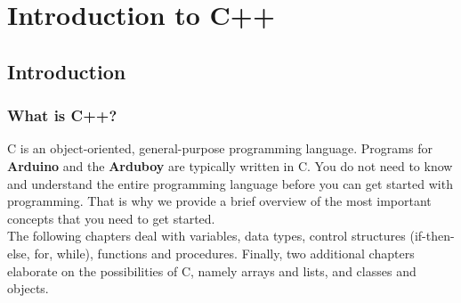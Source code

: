\documentclass[11pt,fleqn]{book} %
\def\Cpp{{C\nolinebreak[4]\hspace{-.05em}\raisebox{.4ex}{\tiny\bf ++}}}
\begin{document}



\pagestyle{empty} %

\tableofcontents %

\cleardoublepage %

\pagestyle{fancy} %


\part{Introduction to C++}
\chapter{Introduction}
\section{What is C++?}
\Cpp{} is an object-oriented, general-purpose programming language.  Programs for \textbf{Arduino} and the \textbf{Arduboy} are typically written in  \Cpp\index{C++@\Cpp}. You do not need to know and understand the entire programming language before you can get started with programming. That is why we provide a brief overview of the most important concepts that you need to get started.\\

\noindent The following chapters deal with variables, data types, control structures (if-then-else, for, while), functions and procedures. Finally, two additional chapters elaborate on the possibilities of \Cpp, namely arrays and lists, and classes and objects.\\
\end{document}
